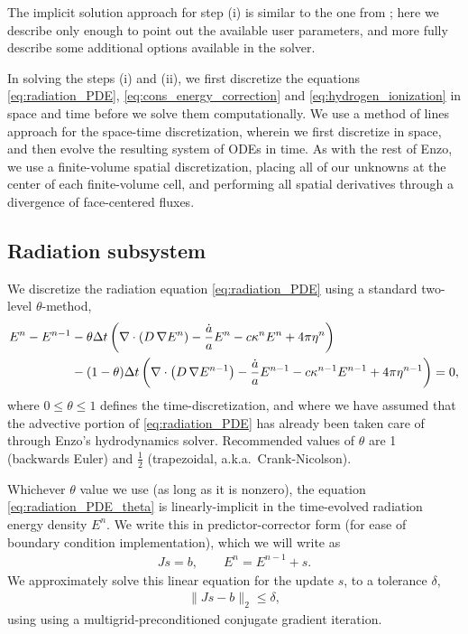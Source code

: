 \documentclass[letterpaper,10pt]{article}
\renewcommand{\(}{\left(}
\renewcommand{\)}{\right)}
\newcommand{\dt}{\Delta t}
\begin{document}
The implicit solution approach for step (i) is similar to the one from 
\cite{ReynoldsHayesPaschosNorman2009}; here we describe only enough
to point out the available user parameters, and more fully describe
some additional options available in the solver.

In solving the steps (i) and (ii), we first discretize the
equations \eqref{eq:radiation_PDE}, \eqref{eq:cons_energy_correction}
and \eqref{eq:hydrogen_ionization} in space and time before we solve
them computationally.  We use a method of lines approach for the
space-time discretization, wherein we first discretize in space, and
then evolve the resulting system of ODEs in time.  As with the rest of
Enzo, we use a finite-volume spatial discretization, placing all of
our unknowns at the center of each finite-volume cell, and performing
all spatial derivatives through a divergence of face-centered fluxes.


\subsection{Radiation subsystem}
\label{sec:rad_solve}

We discretize the radiation equation \eqref{eq:radiation_PDE} using a
standard two-level $\theta$-method,
\begin{align}
  \label{eq:radiation_PDE_theta}
  E^n - E^{n-1} &- \theta\dt\left(\nabla\cdot\(D\,\nabla E^n\) - \frac{\dot{a}}{a} E^n -
    c\kappa^n E^n + 4\pi\eta^n\right) \\ 
  \notag
  & - (1-\theta)\dt\left(\nabla\cdot\(D\,\nabla E^{n-1}\) - \frac{\dot{a}}{a} E^{n-1} -
    c\kappa^{n-1} E^{n-1} + 4\pi\eta^{n-1}\right) = 0,
\end{align}
where $0\le\theta\le 1$ defines the time-discretization, and where we
have assumed that the advective portion of \eqref{eq:radiation_PDE}
has already been taken care of through Enzo's hydrodynamics solver.
Recommended values of $\theta$ are 1 (backwards Euler) and $\frac12$
(trapezoidal, a.k.a.~Crank-Nicolson).  

Whichever $\theta$ value we use (as long as it is nonzero), the
equation \eqref{eq:radiation_PDE_theta} is linearly-implicit in the
time-evolved radiation energy density $E^n$.  We write this in
predictor-corrector form (for ease of boundary condition
implementation), which we will write as
\begin{align}
\label{eq:linear_system}
  J s = b, \qquad E^n = E^{n-1} + s.
\end{align}
We approximately solve this linear equation for the update $s$,
to a tolerance $\delta$,
\begin{align}
\label{eq:linear_system_approx}
  \| J s - b \|_2 \le \delta,
\end{align}
using using a multigrid-preconditioned conjugate gradient iteration.
\end{document}
